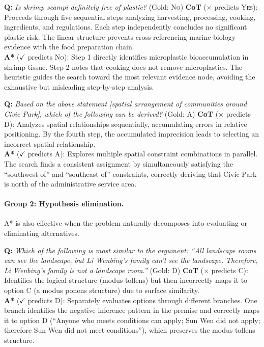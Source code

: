 \documentclass[11pt]{article}
\begin{document}
{\begin{examplebox}[title=StrategyQA --- Non-linear Evidence Aggregation]
\textbf{Q:} \emph{Is shrimp scampi definitely free of plastic?} \quad (Gold: \textsc{No})
\tcblower
\textbf{CoT} ($\times$ predicts \textsc{Yes}): Proceeds through five sequential steps analyzing harvesting, processing, cooking, ingredients, and regulations. Each step independently concludes no significant plastic risk. The linear structure prevents cross-referencing marine biology evidence with the food preparation chain.\\[4pt]
\textbf{A*} ($\checkmark$ predicts \textsc{No}): Step 1 directly identifies microplastic bioaccumulation in shrimp tissue. Step 2 notes that cooking does not remove microplastics. The heuristic guides the search toward the most relevant evidence node, avoiding the exhaustive but misleading step-by-step analysis.
\end{examplebox}

\begin{examplebox}[title=LogicQA --- Non-linear Evidence Aggregation]
\textbf{Q:} \emph{Based on the above statement [spatial arrangement of communities around Civic Park], which of the following can be derived?} \quad (Gold: A)
\tcblower
\textbf{CoT} ($\times$ predicts D): Analyzes spatial relationships sequentially, accumulating errors in relative positioning. By the fourth step, the accumulated imprecision leads to selecting an incorrect spatial relationship.\\[4pt]
\textbf{A*} ($\checkmark$ predicts A): Explores multiple spatial constraint combinations in parallel. The search finds a consistent assignment by simultaneously satisfying the ``southwest of'' and ``southeast of'' constraints, correctly deriving that Civic Park is north of the administrative service area.
\end{examplebox}

\paragraph{Group 2: Hypothesis elimination.}
A* is also effective when the problem naturally decomposes into evaluating or eliminating alternatives.

\begin{examplebox}[title=LogicQA --- Hypothesis Elimination]
\textbf{Q:} \emph{Which of the following is most similar to the argument: ``All landscape rooms can see the landscape, but Li Wenbing's family can't see the landscape. Therefore, Li Wenbing's family is not a landscape room.''} \quad (Gold: D)
\tcblower
\textbf{CoT} ($\times$ predicts C): Identifies the logical structure (modus tollens) but then incorrectly maps it to option C (a modus ponens structure) due to surface similarity.\\[4pt]
\textbf{A*} ($\checkmark$ predicts D): Separately evaluates options through different branches. One branch identifies the negative inference pattern in the premise and correctly maps it to option D (``Anyone who meets conditions can apply; Sun Wen did not apply; therefore Sun Wen did not meet conditions''), which preserves the modus tollens structure.
\end{examplebox}

}
\end{document}
